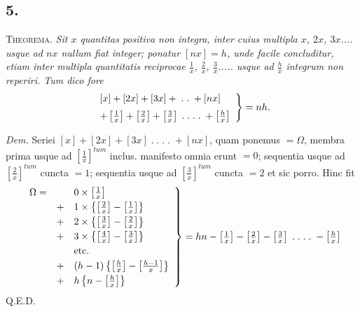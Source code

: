 \documentclass[14pt]{memoir}
\begin{document}
\subsection*{5.} 

\textsc{Theorema}. \textit{Sit \(x\) quantitas positiva non integra, inter cuius multipla \(x\), \(2x\), \(3x\)\;.\;.\;.\;.\; usque ad \(nx\) nullum fiat integer; ponatur \([nx]=h\), unde facile concluditur, etiam inter multipla quantitatis reciprocae \(\tfrac{1}{x}\), \(\tfrac{2}{x}\), \(\tfrac{3}{x}\)\;.\;.\;.\;.\;.\; usque ad \(\tfrac{h}{x}\) integrum non reperiri.  Tum dico fore }
\[ \left. \begin{array}{l} [x] + [2x] + [3x] + \;.\;.\; + [nx] \vspace{2mm} \\ + \left[\tfrac{1}{x}\right] + \left[ \tfrac{2}{x} \right] + \left[\tfrac{3}{x} \right] \;.\;.\;.\;.\; + \left[\tfrac{h}{x}\right] \end{array} \right\} = nh . \]

\textit{Dem.} Seriei \([x] + [2x] + [3x] \;.\;.\;.\;.\; + [nx]\), quam ponemus \(=\Omega\), membra prima usque ad \(\left[\tfrac{1}{x}\right]^{tum}\) inclus. manifesto omnia erunt \(= 0\); sequentia usque ad \(\left[\tfrac{2}{x}\right]^{tum}\) cuncta \(=1\); sequentia usque ad \(\left[\tfrac{3}{x}\right]^{tum}\) cuncta \(=2\) et sic porro. Hinc fit 
\[ \left. \begin{array}{rrl} \Omega = & &0 \times \left[\tfrac{1}{x}\right] \vspace{1mm} \\
& +& 1 \times \left\{ \left[\tfrac{2}{x}\right] - \left[\tfrac{1}{x}\right] \right\} \vspace{1mm} \\
& +& 2 \times \left\{ \left[\tfrac{3}{x}\right] - \left[\tfrac{2}{x}\right] \right\}\vspace{1mm}  \\
& +& 3 \times \left\{ \left[\tfrac{4}{x}\right] - \left[\tfrac{3}{x}\right] \right\}\vspace{1mm}  \\
&& \text{etc.}\vspace{1mm}  \\ 
& +& (h-1)  \left\{ \left[\tfrac{h}{x}\right] - \left[\tfrac{h-1}{x}\right] \right\} \vspace{1mm} \\
& +& h \left\{ n - \left[\tfrac{h}{x}\right] \right\} \end{array} \right\} = hn - \left[\tfrac{1}{x}\right] - \left[\tfrac{2}{x}\right]- \left[\tfrac{3}{x}\right] \;.\;.\;.\;.\; - \left[\tfrac{h}{x}\right] \]
Q.E.D. 
\end{document}

